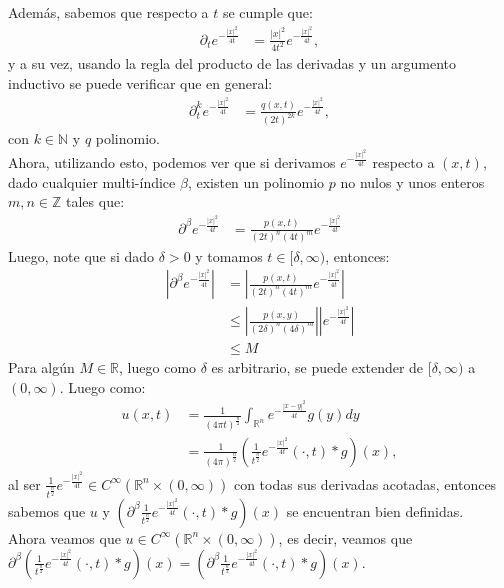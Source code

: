 \begin{homeworkProblem}
\begin{solucion}
\begin{enumerate}
        Además, sabemos que respecto a $t$ se cumple que:
        \begin{align*}
          \partial_{t}e^{-\frac{|x|^2}{4t}}& = \frac{|x|^{2}}{4t^2} e^{-\frac{|x|^2}{4t}},
        \end{align*}
        y a su vez, usando la regla del producto de las derivadas y un argumento inductivo se puede verificar que en general:
        \begin{align*}
          \partial^{k}_{t}e^{-\frac{|x|^2}{4t}}&=\frac{q(x,t)}{(2t)^{2k}}e^{-\frac{|x|^2}{4t}},
        \end{align*}
        con $k\in \mathbb{N}$ y $q$ polinomio.\\
        Ahora, utilizando esto, podemos ver que si derivamos $e^{-\frac{|x|^2}{4t}}$ respecto a $(x,t)$, dado cualquier multi-índice $\beta$, existen un polinomio $p$ no nulos y unos enteros $m,n\in \mathbb{Z}$ tales que:
        \begin{align*}
          \partial^{\beta}e^{-\frac{|x|^2}{4t}}&=\frac{p(x,t)}{(2t)^n(4t)^m}e^{-\frac{|x|^2}{4t}}
        \end{align*}
        Luego, note que si dado $\delta>0$ y tomamos $t\in[\delta, \infty)$, entonces:
        \begin{align*}
          \left|\partial^{\beta}e^{-\frac{|x|^2}{4t}}\right|&=\left|\frac{p(x,t)}{(2t)^n(4t)^m}e^{-\frac{|x|^2}{4t}}\right|\\
          &\leq \left|\frac{p(x,y)}{(2\delta)^n(4\delta)^m}\right|\left|e^{-\frac{|x|^2}{4t}}\right|\\
          &\leq M
        \end{align*}
        Para algún $M\in \mathbb{R}$, luego como $\delta$ es arbitrario, se puede extender de $[\delta,\infty)$ a $(0,\infty)$. 
        Luego como:
        \begin{align*}
          u(x,t)&=\frac{1}{(4\pi t)^{\frac{n}{2}}}\int_{\mathbb{R}^{n}}e^{-\frac{|x-y|^2}{4t}}g(y)dy\\
          &=\frac{1}{(4\pi)^{\frac{n}{2}}}\left( \frac{1}{t^{\frac{n}{2}}}e^{-\frac{|x|^2}{4t}}(\cdot,t)*g \right)(x),
        \end{align*}
        al ser $\frac{1}{t^{\frac{n}{2}}}e^{-\frac{|x|^2}{4t}}\in C^{\infty}(\mathbb{R}^{n}\times(0,\infty))$ con todas sus derivadas acotadas, entonces sabemos que $u$ y $\left( \partial^{\beta}\frac{1}{t^{\frac{n}{2}}}e^{-\frac{|x|^2}{4t}}(\cdot,t)*g \right)(x)$ se encuentran bien definidas.\\
        Ahora veamos que $u\in C^{\infty}(\mathbb{R}^{n}\times (0,\infty))$, es decir, veamos que $\partial^{\beta}\left( \frac{1}{t^{\frac{n}{2}}}e^{-\frac{|x|^2}{4t}}(\cdot,t)*g \right)(x)=\left( \partial^{\beta}\frac{1}{t^{\frac{n}{2}}}e^{-\frac{|x|^2}{4t}}(\cdot,t)*g \right)(x)$.\\

\end{enumerate}
\end{solucion}
\end{homeworkProblem}
